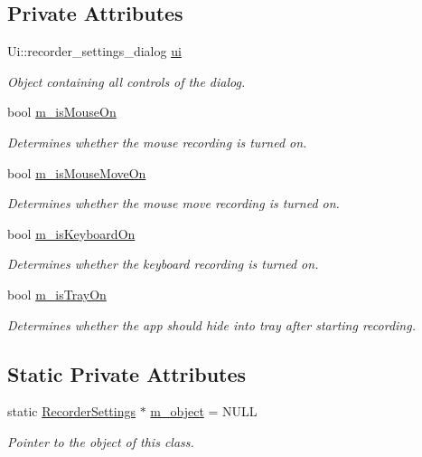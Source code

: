 \subsection*{Private Attributes}
\begin{DoxyCompactItemize}
\item 
Ui\-::recorder\-\_\-settings\-\_\-dialog \hyperlink{class_recorder_settings_a340469e3caa419c0ec0ad6de8905fabf}{ui}
\begin{DoxyCompactList}\small\item\em Object containing all controls of the dialog. \end{DoxyCompactList}\item 
bool \hyperlink{class_recorder_settings_a746410b0e99f530247dd7146a70e53c4}{m\-\_\-is\-Mouse\-On}
\begin{DoxyCompactList}\small\item\em Determines whether the mouse recording is turned on. \end{DoxyCompactList}\item 
bool \hyperlink{class_recorder_settings_a28a563230501520415b36633749276d1}{m\-\_\-is\-Mouse\-Move\-On}
\begin{DoxyCompactList}\small\item\em Determines whether the mouse move recording is turned on. \end{DoxyCompactList}\item 
bool \hyperlink{class_recorder_settings_ae0def32c58f09b7bee960fe1ce8e9aaa}{m\-\_\-is\-Keyboard\-On}
\begin{DoxyCompactList}\small\item\em Determines whether the keyboard recording is turned on. \end{DoxyCompactList}\item 
bool \hyperlink{class_recorder_settings_a2b5b6ad1d9a307f00556591392dbeae8}{m\-\_\-is\-Tray\-On}
\begin{DoxyCompactList}\small\item\em Determines whether the app should hide into tray after starting recording. \end{DoxyCompactList}\end{DoxyCompactItemize}
\subsection*{Static Private Attributes}
\begin{DoxyCompactItemize}
\item 
static \hyperlink{class_recorder_settings}{Recorder\-Settings} $\ast$ \hyperlink{class_recorder_settings_a5724a34a18697325a9c756182c4b5404}{m\-\_\-object} = N\-U\-L\-L
\begin{DoxyCompactList}\small\item\em Pointer to the object of this class. \end{DoxyCompactList}\end{DoxyCompactItemize}


